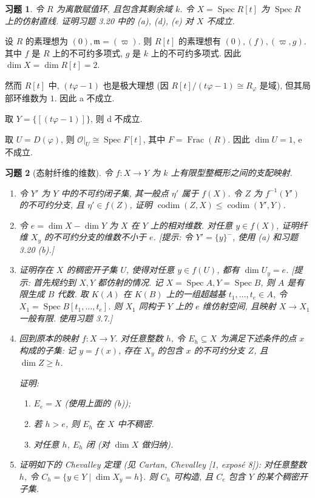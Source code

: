 \documentclass{article}
\theoremstyle{exercise}
\newtheorem{exercise}{习题}[section]
\newenvironment{proofc}{\proof}{\endproof}
\def\gm{\mathfrak{m}}
\def\sO{\mathcal{O}}
\def\Spec{\operatorname{Spec}}
\def\dim{\operatorname{dim}}
\def\codim{\operatorname{codim}}
\def\Frac{\operatorname{Frac}}
\def\leq{\leqslant}
\def\geq{\geqslant}
\begin{document}
\begin{exercise}
  令 $R$ 为离散赋值环, 且包含其剩余域 $k$.
  令 $X = \Spec R[t]$ 为 $\Spec R$ 上的仿射直线.
  证明习题 3.20 中的 (a), (d), (e) 对 $X$ 不成立.
\end{exercise}

\begin{proofc}
  设 $R$ 的素理想为 $(0), \gm = (\varpi)$.
  则 $R[t]$ 的素理想有 $(0), (f), (\varpi, g)$. 其中 $f$ 是 $R$ 上的不可约多项式,
  $g$ 是 $k$ 上的不可约多项式. 因此 $\dim X = \dim R[t] = 2$.

  然而 $R[t]$ 中, $(t\varphi - 1)$ 也是极大理想
  (因 $R[t] / (t\varphi - 1) \cong R_{\varphi}$ 是域),
  但其局部环维数为 $1$. 因此 a 不成立.

  取 $Y = \{ [(t\varphi - 1)] \}$, 则 d 不成立.

  取 $U = D(\varphi)$, 则 $\sO|_U \cong \Spec F[t]$, 其中 $F = \Frac(R)$.
  因此 $\dim U = 1$, e 不成立.
\end{proofc}

\begin{exercise}[态射纤维的维数]
  令 $f \colon X \to Y$ 为 $k$ 上有限型整概形之间的支配映射.
  \begin{enumerate}[label={(\alph*)}]
    \item 令 $Y'$ 为 $Y$ 中的不可约闭子集, 其一般点 $\eta'$ 属于 $f(X)$.
          令 $Z$ 为 $f^{-1}(Y')$ 的不可约分支, 且 $\eta' \in f(Z)$,
          证明 $\codim(Z, X) \leq \codim(Y', Y)$.
    \item 令 $e = \dim X - \dim Y$ 为 $X$ 在 $Y$ 上的\emph{相对维数}.
          对任意 $y \in f(X)$, 证明纤维 $X_y$ 的不可约分支的维数不小于 $e$.
          [\emph{提示: 令 $Y' = \{y\}^-$, 使用 (a) 和习题 3.20 (b).}]
    \item 证明存在 $X$ 的稠密开子集 $U$, 使得对任意 $y \in f(U)$,
          都有 $\dim U_y = e$.
          [\emph{提示: 首先规约到 $X, Y$ 都仿射的情况. 记 $X = \Spec A, Y = \Spec B$,
          则 $A$ 是有限生成 $B$ 代数. 取 $K(A)$ 在 $K(B)$ 上的一组超越基
          $t_1, \dots, t_e \in A$, 令 $X_1 = \Spec B[t_1, \dots, t_e]$.
          则 $X_1$ 同构于 $Y$ 上的 $e$ 维仿射空间,
          且映射 $X \to X_1$ 一般有限. 使用习题 3.7.}]
    \item 回到原本的映射 $f \colon X \to Y$.
          对任意整数 $h$, 令 $E_h \subseteq X$ 为满足下述条件的点 $x$ 构成的子集:
          记 $y = f(x)$, 存在 $X_y$ 的包含 $x$ 的不可约分支 $Z$, 且 $\dim Z \geq h$.

          证明:
          \begin{enumerate}[label={\arabic*.}]
            \item $E_e = X$ (使用上面的 (b));
            \item 若 $h > e$, 则 $E_h$ 在 $X$ 中不稠密.
            \item 对任意 $h$, $E_h$ 闭 (对 $\dim X$ 做归纳).
          \end{enumerate}
    \item 证明如下的 Chevalley 定理 (见 Cartan, Chevalley [1, exposé 8]):
          对任意整数 $h$, 令 $C_h = \{ y \in Y \mid \dim X_y = h \}$.
          则 $C_h$ 可构造, 且 $C_e$ 包含 $Y$ 的某个稠密开子集.
  \end{enumerate}
\end{exercise}
\end{document}
